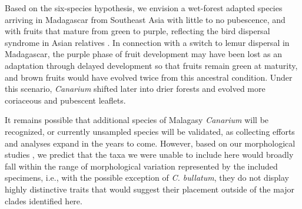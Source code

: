 \documentclass[10pt,letterpaper]{article}
\begin{document}
Based on the six-species hypothesis, we envision a wet-forest adapted species arriving in Madagascar from Southeast Asia with little to no pubescence, and with fruits that mature from green to purple, reflecting the bird dispersal syndrome in Asian relatives \cite{federman_biogeographic_2015}. In connection with a switch to lemur dispersal in Madagascar, the purple phase of fruit development may have been lost as an adaptation through delayed development so that fruits remain green at maturity, and brown fruits would have evolved twice from this ancestral condition. Under this scenario, \emph{Canarium} shifted later into drier forests and evolved more coriaceous and pubescent leaflets. 


It remains possible that additional species of Malagasy \emph{Canarium} will be recognized, or currently unsampled species will be validated, as collecting efforts and analyses expand in the years to come. However, based on our morphological studies \cite{daly_revision_2015}, we predict that the taxa we were unable to include here would broadly fall within the range of morphological variation represented by the included specimens, i.e., with the possible exception of \emph{C. bullatum}, they do not display highly distinctive traits that would suggest their placement outside of the major clades identified here.
\end{document}
